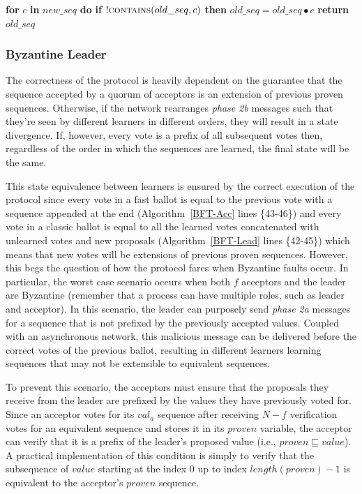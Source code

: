 \begin{algorithm}
\begin{algorithmic}[1]
		\State		
		\State \textbf{for} $c$ \textbf{in} $new\_seq$ \textbf{do} 
		\State \hspace{\algorithmicindent} \textbf{if} $!\Call{contains}{old\_seq,c}$ \textbf{then}
		\State \hspace{\algorithmicindent}\hspace{\algorithmicindent}\hspace{\algorithmicindent} $old\_seq =  old\_seq \bullet c$
		\State \textbf{return} $old\_seq$
		\EndFunction
	\end{algorithmic}
\end{algorithm}

\subsubsection{Byzantine Leader}
The correctness of the protocol is heavily dependent on the guarantee that the sequence accepted by a quorum of acceptors is an extension of previous 
proven sequences. Otherwise, if the network rearranges \textit{phase 2b} messages such that they're seen by different learners in different orders, they will result in a state divergence. If, however, every vote is a prefix of all subsequent votes then, regardless of the order in which the sequences are learned, the final state will be the same. \par 
This state equivalence between learners is ensured by the correct execution of the protocol since every vote in a fast ballot is equal to the previous vote with a sequence appended at the end (Algorithm~\ref{BFT-Acc} lines \{43-46\}) and every vote in a classic ballot is equal to all the learned votes concatenated with unlearned votes and new proposals (Algorithm~\ref{BFT-Lead} lines \{42-45\}) which means that new votes will be extensions of previous proven sequences. However, this begs the question of how the protocol fares when Byzantine faults occur. In particular, the worst case scenario occurs when both $f$ acceptors and the leader are Byzantine (remember that a process can have multiple roles, such as leader and acceptor). In this scenario, the leader can purposely send \textit{phase 2a} messages for a sequence that is not prefixed by the previously accepted values. Coupled with an asynchronous network, this malicious message can be delivered before the correct votes of the previous ballot, resulting in different learners learning sequences that may not be extensible to equivalent sequences. \par
To prevent this scenario, the acceptors must ensure that the proposals they receive from the leader are prefixed by the values they have previously voted for. Since an acceptor votes for its $val_a$ sequence after receiving $N-f$ verification votes for an equivalent sequence and stores it in its $proven$ variable, the acceptor can verify that it is a prefix of the leader's proposed value (i.e., $proven \sqsubseteq value$). A practical implementation of this condition is simply to verify that the  subsequence of $value$ starting at the index $0$ up to index $length(proven)-1$ is equivalent to the acceptor's $proven$ sequence. 


